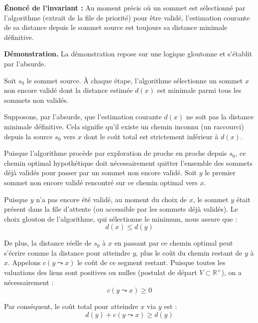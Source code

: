 \documentclass[11pt,a4paper]{report}
\begin{document}
	\textbf{Énoncé de l'invariant :} Au moment précis où un sommet est sélectionné par l'algorithme (extrait de la file de priorité) pour être validé, l'estimation courante de sa distance depuis le sommet source est toujours sa distance minimale définitive.
	
	\vspace{0.5cm}
	\noindent\textbf{Démonstration.}
	La démonstration repose sur une logique gloutonne et s'établit par l'absurde.
	
	Soit $s_0$ le sommet source.
	À chaque étape, l'algorithme sélectionne un sommet $x$ non encore validé dont la distance estimée $d(x)$ est minimale parmi tous les sommets non validés.
	
	Supposons, par l'absurde, que l'estimation courante $d(x)$ ne soit pas la distance minimale définitive. Cela signifie qu'il existe un chemin inconnu (un \og{}raccourci\fg{}) depuis la source $s_0$ vers $x$ dont le coût total est strictement inférieur à $d(x)$.
	
	Puisque l'algorithme procède par exploration de proche en proche depuis $s_0$, ce chemin optimal hypothétique doit nécessairement quitter l'ensemble des sommets déjà validés pour passer par un sommet non encore validé. 
	Soit $y$ le premier sommet non encore validé rencontré sur ce chemin optimal vers $x$.
	
	Puisque $y$ n'a pas encore été validé, au moment du choix de $x$, le sommet $y$ était présent dans la file d'attente (ou accessible par les sommets déjà validés). Le choix glouton de l'algorithme, qui sélectionne le minimum, nous assure que :
	\begin{equation}
		d(x) \leq d(y)
	\end{equation}
	
	De plus, la distance réelle de $s_0$ à $x$ en passant par ce chemin optimal peut s'écrire comme la distance pour atteindre $y$, plus le coût du chemin restant de $y$ à $x$. Appelons $c(y \leadsto x)$ le coût de ce segment restant. 
	Puisque toutes les valuations des liens sont positives ou nulles (postulat de départ $V \subset \mathbb{R}^+$), on a nécessairement :
	\begin{equation}
		c(y \leadsto x) \geq 0
	\end{equation}
	
	Par conséquent, le coût total pour atteindre $x$ via $y$ est :
	\begin{equation}
		d(y) + c(y \leadsto x) \geq d(y)
	\end{equation}
	
\end{document}
